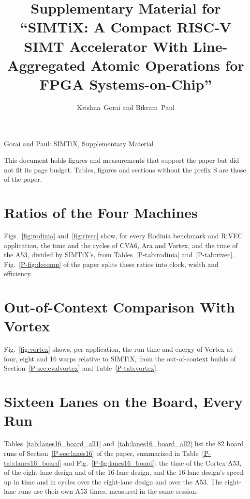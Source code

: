 \documentclass[journal]{IEEEtran}
\begin{document}
\title{Supplementary Material for ``SIMTiX: A Compact RISC-V SIMT Accelerator With
Line-Aggregated Atomic Operations for FPGA Systems-on-Chip''}
\author{Krishna~Gorai and Bikram~Paul}
%
{Gorai and Paul: SIMTiX, Supplementary Material}
\maketitle

This document holds figures and measurements that support the paper but did not fit
its page budget. Tables, figures and sections without the prefix S are those of the
paper.

\section{Ratios of the Four Machines}\label{sup:ratios}
Figs.~\ref{fig:rodinia} and~\ref{fig:rivec} show, for every Rodinia benchmark and
RiVEC application, the time and the cycles of CVA6, Ara and Vortex, and the time of
the A53, divided by SIMTiX's, from Tables~\ref{P-tab:rodinia} and~\ref{P-tab:rivec}.
Fig.~\ref{P-fig:decomp} of the paper splits these ratios into clock, width and
efficiency.



\section{Out-of-Context Comparison With Vortex}\label{sup:vortex}
Fig.~\ref{fig:vortex} shows, per application, the run time and energy of Vortex at
four, eight and 16 warps relative to SIMTiX, from the out-of-context builds of
Section~\ref{P-sec:evalvortex} and Table~\ref{P-tab:vortex}.





\section{Sixteen Lanes on the Board, Every Run}\label{sup:lanes16}
Tables~\ref{tab:lanes16_board_all1} and~\ref{tab:lanes16_board_all2} list the 82
board runs of Section~\ref{P-sec:lanes16} of the paper, summarized in
Table~\ref{P-tab:lanes16_board} and Fig.~\ref{P-fig:lanes16_board}: the time of the
Cortex-A53, of the eight-lane design and of the 16-lane design, and the 16-lane design's
speed-up in time and in cycles over the eight-lane design and over the A53. The
eight-lane runs use their own A53 times, measured in the same session.
\end{document}

